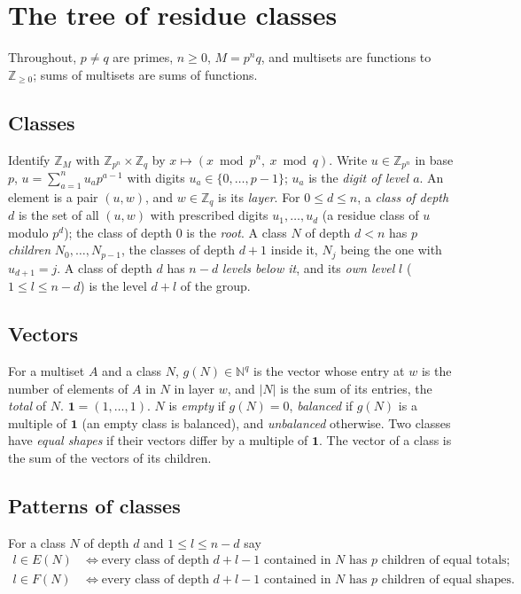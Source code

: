 \documentclass[11pt,a4paper]{amsart}
\theoremstyle{definition}
\theoremstyle{remark}
\newcommand{\Z}{\mathbb{Z}}
\newcommand{\N}{\mathbb{N}}
\newcommand{\one}{\mathbf{1}}
\begin{document}
\section{The tree of residue classes}\label{sec:tree}

Throughout, $p\ne q$ are primes, $n\ge 0$, $M=p^nq$, and multisets are functions to $\Z_{\ge 0}$; sums of
multisets are sums of functions.

\subsection*{Classes} Identify $\Z_M$ with $\Z_{p^n}\times\Z_q$ by $x\mapsto(x \bmod p^n,\ x\bmod q)$. Write
$u\in\Z_{p^n}$ in base $p$, $u=\sum_{a=1}^{n}u_a p^{a-1}$ with digits $u_a\in\{0,\dots,p-1\}$; $u_a$ is the
\emph{digit of level $a$}. An element is a pair $(u,w)$, and $w\in\Z_q$ is its \emph{layer}. For
$0\le d\le n$, a \emph{class of depth $d$} is the set of all $(u,w)$ with prescribed digits $u_1,\dots,u_d$
(a residue class of $u$ modulo $p^d$); the class of depth $0$ is the \emph{root}. A class $N$ of depth $d<n$
has $p$ \emph{children} $N_0,\dots,N_{p-1}$, the classes of depth $d+1$ inside it, $N_j$ being the one with
$u_{d+1}=j$. A class of depth $d$ has $n-d$ \emph{levels below it}, and its \emph{own level} $l$
($1\le l\le n-d$) is the level $d+l$ of the group.

\subsection*{Vectors} For a multiset $A$ and a class $N$, $g(N)\in\N^q$ is the vector whose entry at $w$ is the
number of elements of $A$ in $N$ in layer $w$, and $|N|$ is the sum of its entries, the \emph{total} of $N$.
$\one=(1,\dots,1)$. $N$ is \emph{empty} if $g(N)=0$, \emph{balanced} if $g(N)$ is a multiple of $\one$ (an
empty class is balanced), and \emph{unbalanced} otherwise. Two classes have \emph{equal shapes} if their
vectors differ by a multiple of $\one$. The vector of a class is the sum of the vectors of its children.

\subsection*{Patterns of classes} For a class $N$ of depth $d$ and $1\le l\le n-d$ say
\begin{align*}
 l\in E(N)&\iff\text{every class of depth $d+l-1$ contained in $N$ has $p$ children of equal totals;}\\
 l\in F(N)&\iff\text{every class of depth $d+l-1$ contained in $N$ has $p$ children of equal shapes.}
\end{align*}
\end{document}
